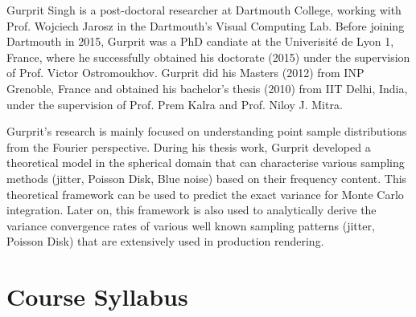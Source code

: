 \documentclass[11pt,fleqn]{book} %
\begin{document}
Gurprit Singh is a post-doctoral researcher at Dartmouth College, working with Prof. Wojciech Jarosz in the Dartmouth's Visual Computing Lab. Before joining Dartmouth in 2015, Gurprit was a PhD candiate 
at the Univerisit\'{e} de Lyon 1, France, where he successfully obtained his doctorate (2015) under the 
supervision of Prof. Victor Ostromoukhov. Gurprit did his Masters (2012) from INP Grenoble, France and 
obtained his bachelor's thesis (2010) from IIT Delhi, India, under the supervision of Prof. Prem Kalra and Prof. Niloy J. Mitra.

Gurprit's research is mainly focused on understanding point sample distributions from the Fourier perspective. During his thesis work, Gurprit developed a theoretical model in the spherical domain that can characterise various sampling methods (jitter, Poisson Disk, Blue noise) based on their frequency content. This theoretical framework can be used to predict the exact variance for Monte Carlo integration. Later on, this framework is also used to analytically derive the variance convergence rates 
of various well known sampling patterns (jitter, Poisson Disk) that are extensively used in production rendering.
\cleardoublepage




{}
\chapter*{Course Syllabus}
%

%
%
%
%
%
\end{document}
